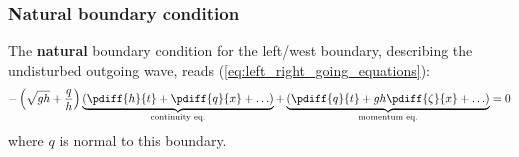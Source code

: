\subsubsection{Natural boundary condition}
The \textbf{natural} boundary condition for the left/west boundary, describing the undisturbed outgoing wave, reads (\autoref{eq:left_right_going_equations}):
\begin{align}
    - \left(\sqrt{gh} + \frac{q}{h}\right) \underbrace{ \left(\pdiff{h}{t} + \pdiff{q}{x} + \ldots \right) }_{\text{continuity eq.}} + \underbrace{\left(\pdiff{q}{t} + g h \pdiff{\zeta}{x}+\ldots\right)}_{\text{momentum eq.}} = 0
\end{align}
where $q$ is normal to this boundary.

